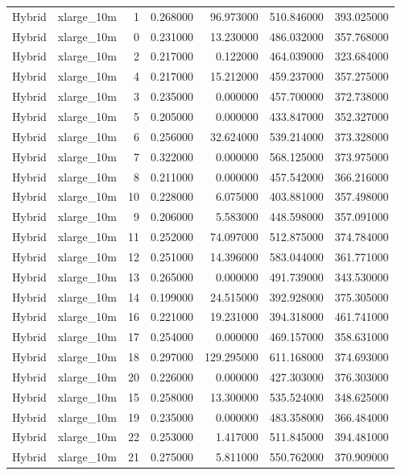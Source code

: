 \begin{tabular}{llrrrrr}
Hybrid & xlarge_10m & 1 & 0.268000 & 96.973000 & 510.846000 & 393.025000 \\
Hybrid & xlarge_10m & 0 & 0.231000 & 13.230000 & 486.032000 & 357.768000 \\
Hybrid & xlarge_10m & 2 & 0.217000 & 0.122000 & 464.039000 & 323.684000 \\
Hybrid & xlarge_10m & 4 & 0.217000 & 15.212000 & 459.237000 & 357.275000 \\
Hybrid & xlarge_10m & 3 & 0.235000 & 0.000000 & 457.700000 & 372.738000 \\
Hybrid & xlarge_10m & 5 & 0.205000 & 0.000000 & 433.847000 & 352.327000 \\
Hybrid & xlarge_10m & 6 & 0.256000 & 32.624000 & 539.214000 & 373.328000 \\
Hybrid & xlarge_10m & 7 & 0.322000 & 0.000000 & 568.125000 & 373.975000 \\
Hybrid & xlarge_10m & 8 & 0.211000 & 0.000000 & 457.542000 & 366.216000 \\
Hybrid & xlarge_10m & 10 & 0.228000 & 6.075000 & 403.881000 & 357.498000 \\
Hybrid & xlarge_10m & 9 & 0.206000 & 5.583000 & 448.598000 & 357.091000 \\
Hybrid & xlarge_10m & 11 & 0.252000 & 74.097000 & 512.875000 & 374.784000 \\
Hybrid & xlarge_10m & 12 & 0.251000 & 14.396000 & 583.044000 & 361.771000 \\
Hybrid & xlarge_10m & 13 & 0.265000 & 0.000000 & 491.739000 & 343.530000 \\
Hybrid & xlarge_10m & 14 & 0.199000 & 24.515000 & 392.928000 & 375.305000 \\
Hybrid & xlarge_10m & 16 & 0.221000 & 19.231000 & 394.318000 & 461.741000 \\
Hybrid & xlarge_10m & 17 & 0.254000 & 0.000000 & 469.157000 & 358.631000 \\
Hybrid & xlarge_10m & 18 & 0.297000 & 129.295000 & 611.168000 & 374.693000 \\
Hybrid & xlarge_10m & 20 & 0.226000 & 0.000000 & 427.303000 & 376.303000 \\
Hybrid & xlarge_10m & 15 & 0.258000 & 13.300000 & 535.524000 & 348.625000 \\
Hybrid & xlarge_10m & 19 & 0.235000 & 0.000000 & 483.358000 & 366.484000 \\
Hybrid & xlarge_10m & 22 & 0.253000 & 1.417000 & 511.845000 & 394.481000 \\
Hybrid & xlarge_10m & 21 & 0.275000 & 5.811000 & 550.762000 & 370.909000 \\

\end{tabular}
